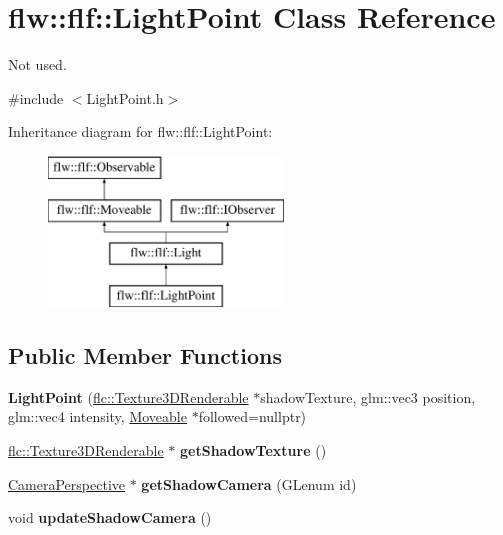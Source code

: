 \hypertarget{classflw_1_1flf_1_1LightPoint}{}\section{flw\+:\+:flf\+:\+:Light\+Point Class Reference}
\label{classflw_1_1flf_1_1LightPoint}


Not used.  




{\ttfamily \#include $<$Light\+Point.\+h$>$}

Inheritance diagram for flw\+:\+:flf\+:\+:Light\+Point\+:\begin{figure}[H]
\begin{center}
\leavevmode
\includegraphics[height=4.000000cm]{classflw_1_1flf_1_1LightPoint}
\end{center}
\end{figure}
\subsection*{Public Member Functions}
\begin{DoxyCompactItemize}
\item 
\mbox{\label{classflw_1_1flf_1_1LightPoint_aced1130b88aa549dd6bd2db34d973676}} 
{\bfseries Light\+Point} (\hyperlink{classflw_1_1flc_1_1Texture3DRenderable}{flc\+::\+Texture3\+D\+Renderable} $\ast$shadow\+Texture, glm\+::vec3 position, glm\+::vec4 intensity, \hyperlink{classflw_1_1flf_1_1Moveable}{Moveable} $\ast$followed=nullptr)
\item 
\mbox{\label{classflw_1_1flf_1_1LightPoint_a360693d8884ed0a0265da43d1643b2c1}} 
\hyperlink{classflw_1_1flc_1_1Texture3DRenderable}{flc\+::\+Texture3\+D\+Renderable} $\ast$ {\bfseries get\+Shadow\+Texture} ()
\item 
\mbox{\label{classflw_1_1flf_1_1LightPoint_a9902ecb1c3140304fb98a48c318ad1ff}} 
\hyperlink{classflw_1_1flf_1_1CameraPerspective}{Camera\+Perspective} $\ast$ {\bfseries get\+Shadow\+Camera} (G\+Lenum id)
\item 
\mbox{\label{classflw_1_1flf_1_1LightPoint_aa3243fcc69bd0b1c31882dfcc03f2a86}} 
void {\bfseries update\+Shadow\+Camera} ()
\end{DoxyCompactItemize}
